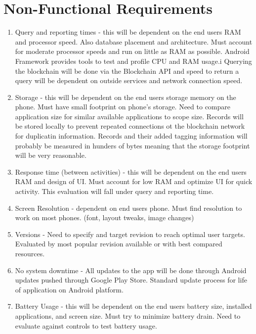 \section{Non-Functional Requirements}


\begin{enumerate}[label=4.\arabic*] 

\item Query and reporting times - this will be dependent on the end users RAM and processor speed. Also database placement and architecture. Must account for moderate processor speeds and run on little as RAM as possible. Android Framework provides tools to test and profile CPU and RAM usage.i Querying the blockchain will be done via the Blockchain API and speed to return a query will be dependent on outside services and network connection speed.

\item Storage - this will be dependent on the end users storage memory on the phone. Must have small footprint on phone’s storage. Need to compare application size for similar available applications to scope size. Records will be stored locally to prevent repeated connections ot the blockchain network for duplicatin information. Records and their added tagging information will probably be measured in hunders of bytes meaning that the storage footprint will be very reasonable.

\item Response time (between activities) - this will be dependent on the end users RAM and design of UI.  Must account for low RAM and optimize UI for quick activity. This evaluation will fall under query and reporting time. 

\item Screen Resolution - dependent on end users phone. Must find resolution to work on most phones. (font, layout tweaks, image changes)

\item Versions - Need to specify and target revision to reach optimal user targets. Evaluated by most popular revision available or with best compared resources. 

\item No system downtime - All updates to the app will be done through Android updates pushed through Google Play Store. Standard update process for life of application on Android platform. 

\item Battery Usage - this will be dependent on the end users battery size, installed applications, and screen size. Must try to minimize battery drain. Need to evaluate against controls to test battery usage. 
\end{enumerate}
